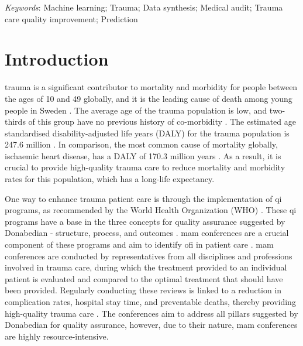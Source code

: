 \documentclass[12pt, a4paper]{article}
\begin{document}
\textit{Keywords}: Machine learning; Trauma; Data synthesis; Medical audit; Trauma care quality improvement; Prediction

\newpage

\normalsize

\glsaddall
\printnoidxglossary[type=acronym,style=csuper]
\printnoidxglossary[style=gsuper]

\newpage
{}


\section{Introduction}
\Gls{trauma} is a significant contributor to mortality and morbidity for people between the ages of 10 and 49 globally, and it is the leading cause of death among young people in Sweden \cite{roth_global_2018, vos_global_2020, sos_death_2021}. The average age of the trauma population is low, and two-thirds of this group have no previous history of co-morbidity \cite{brattstrom_socio-economic_2015}. The estimated age standardised disability-adjusted life years (DALY) for the trauma population is 247.6 million \cite{haagsma_global_2016}. In comparison, the most common cause of mortality globally, ischaemic heart disease, has a DALY of 170.3 million years \cite{wang_global_2021,roth_global_2018}. As a result, it is crucial to provide high-quality trauma care to reduce mortality and morbidity rates for this population, which has a long-life expectancy.

One way to enhance trauma patient care is through the implementation of \acrfull{qi} programs, as recommended by the
World Health Organization (WHO) \cite{world_health_organization_guidelines_2009}. These \acrshort{qi} programs have a
base in the three concepts for quality assurance suggested by Donabedian - structure, process, and outcomes
\cite{donabedian_effectiveness_1996}. \Acrfull{mam} conferences are a crucial component of these programs and aim to
identify \acrfull{ofi} in patient care \cite{santana_development_2014}. \acrshort{mam} conferences are conducted by
representatives from all disciplines and professions involved in trauma care, during which the treatment provided to an
individual patient is evaluated and compared to the optimal treatment that should have been provided. Regularly
conducting these reviews is linked to a reduction in complication rates, hospital stay time, and preventable deaths,
thereby providing high-quality trauma care \cite{stelfox_evidence_2011, mcdermott_trauma_1994}. The conferences aim to
address all pillars suggested by Donabedian for quality assurance, however, due to their nature, \acrshort{mam}
conferences are highly resource-intensive.
\end{document}
